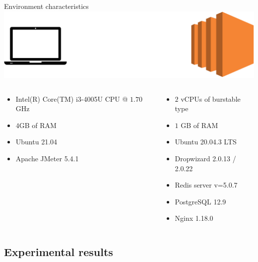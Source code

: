 \documentclass{beamer}
\begin{document}
\begin{frame}{Environment characteristics}
    \centering
    \includegraphics[width=.5\textwidth]{img/clientserver}
    
    \begin{columns}[t]
        \begin{column}{.4\textwidth}
            \begin{itemize}
                \item Intel(R) Core(TM) i3-4005U CPU @ $1.70$GHz
                \item $4$GB of RAM
                \item Ubuntu 21.04
                \item Apache JMeter 5.4.1
            \end{itemize}
        \end{column}
        \begin{column}{.4\textwidth}
            \begin{itemize}
                \item $2$ vCPUs of burstable type
                \item $1$ GB of RAM
                \item Ubuntu 20.04.3 LTS
                \item Dropwizard 2.0.13 / 2.0.22
                \item Redis server v=5.0.7
                \item PostgreSQL 12.9
                \item Nginx 1.18.0
            \end{itemize}
        \end{column}
    \end{columns}
\end{frame}

\subsection{Experimental results}
\end{document}

